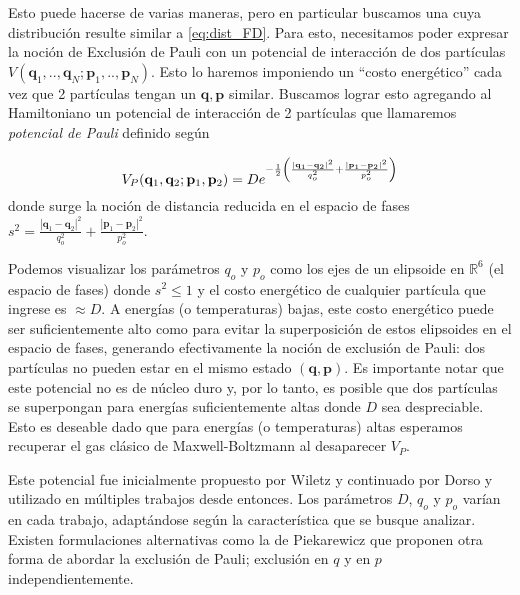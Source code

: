 Esto puede hacerse de varias maneras, pero en particular buscamos una cuya distribución resulte similar a \eqref{eq:dist_FD}.
Para esto, necesitamos poder expresar la noción de Exclusión de Pauli con un potencial de interacción de dos partículas $V(\mathbf{q}_1,..,\mathbf{q}_N;\mathbf{p}_1,..,\mathbf{p}_N)$.
Esto lo haremos imponiendo un ``costo energético'' cada vez que 2 partículas tengan un $\mathbf{q}, \mathbf{p}$ similar.
Buscamos lograr esto agregando al Hamiltoniano un potencial de interacción de 2 partículas que llamaremos \textit{potencial de Pauli} definido según

\begin{equation}{\label{eq:def_int_pauli}}
 V_P(\mathbf{q}_1,\mathbf{q}_2;\mathbf{p}_1,\mathbf{p}_2) = De^{-\frac{1}{2}\left( \frac{|\mathbf{q}_1-\mathbf{q}_2|^2}{q_o^2} +\frac{|\mathbf{p}_1-\mathbf{p}_2|^2}{p_o^2} \right)}
\end{equation}
donde surge la noción de distancia reducida en el espacio de fases $s^2 = \frac{|\mathbf{q}_1-\mathbf{q}_2|^2}{q_o^2} +\frac{|\mathbf{p}_1-\mathbf{p}_2|^2}{p_o^2}$.

Podemos visualizar los parámetros $q_o$ y $p_o$ como los ejes de un elipsoide en $\mathbb{R}^6$ (el espacio de fases) donde $s^2 \leq 1$ y el costo energético de cualquier partícula
que ingrese es $\approx D$.
A energías (o temperaturas) bajas, este costo energético puede ser suficientemente alto como para evitar la superposición de estos elipsoides en el espacio de fases, generando efectivamente
la noción de exclusión de Pauli: dos partículas no pueden estar en el mismo estado $(\mathbf{q}, \mathbf{p})$.
Es importante notar que este potencial no es de núcleo duro y, por lo tanto, es posible que dos partículas se superpongan para energías suficientemente altas donde $D$ sea despreciable.
Esto es deseable dado que para energías (o temperaturas) altas esperamos recuperar el gas clásico de Maxwell-Boltzmann al desaparecer $V_P$.

Este potencial fue inicialmente propuesto por Wiletz \cite{Wilets1977} y continuado por Dorso \cite{Dorso1987, Dorso1988, Dorso1993} y utilizado en múltiples trabajos desde entonces\cite{Maruyama2012, Taruna2008}.
Los parámetros $D$, $q_o$ y $p_o$ varían en cada trabajo, adaptándose según la característica que se busque analizar.
Existen formulaciones alternativas como la de Piekarewicz \cite{Taruna2008} que proponen otra forma de abordar la exclusión de Pauli; exclusión en $q$ y en $p$ independientemente.

